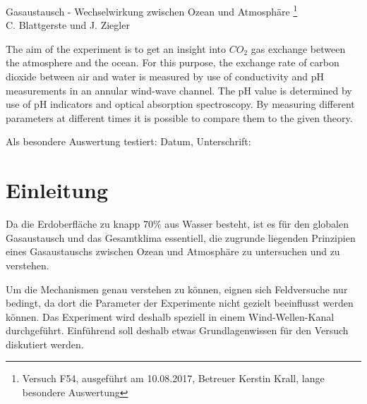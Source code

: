 \documentclass[12pt]{article}
\begin{document}
\thispagestyle{empty}     %
\null\vspace{40mm}
\begin{center}
{%
\Large  Gasaustausch - Wechselwirkung zwischen Ozean und Atmosph\"are
\footnote{\noindent Versuch F54, ausgef\"uhrt am 10.08.2017, Betreuer Kerstin Krall, lange besondere Auswertung}
}\\[15mm]
C. Blattgerste und J. Ziegler

\vspace{25mm}

\parbox{0.9\textwidth}{   %

\small The aim of the experiment is to get an insight into $CO_2$ gas exchange between the atmosphere and the ocean. For this purpose, the exchange rate of carbon dioxide between air and water is measured by use of conductivity and pH measurements in an annular wind-wave channel. The pH value is determined by use of pH indicators and optical absorption spectroscopy. By measuring different parameters at different times it is possible to compare them to the given theory.
}
\end{center}

\vfill
Als besondere Auswertung testiert: Datum, Unterschrift:
\vspace{20mm}

\newpage
\null\thispagestyle{empty}

\newpage     %
\tableofcontents
{}
\newpage

\section{Einleitung}

Da die Erdoberfläche zu knapp 70\% aus Wasser besteht, ist es für den globalen Gasaustausch und das Gesamtklima essentiell, die zugrunde liegenden Prinzipien eines Gasaustauschs zwischen Ozean und Atmosphäre zu untersuchen und zu verstehen.

Um die Mechanismen genau verstehen zu können, eignen sich Feldversuche nur bedingt, da dort die Parameter der Experimente nicht gezielt beeinflusst werden können. Das Experiment wird deshalb speziell in einem Wind-Wellen-Kanal durchgeführt. Einführend soll deshalb etwas Grundlagenwissen für den Versuch diskutiert werden.
\end{document}
